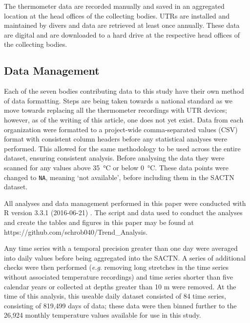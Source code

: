 \documentclass[]{ametsoc}
\begin{document}
The thermometer data are recorded manually and saved in an aggregated location at the head offices of the collecting bodies. UTRs are installed and maintained by divers and data are retrieved at least once annually. These data are digital and are downloaded to a hard drive at the respective head offices of the collecting bodies.

\subsection{Data Management}
Each of the seven bodies contributing data to this study have their own method of data formatting. Steps are being taken towards a national standard as we move towards replacing all the thermometer recordings with UTR devices; however, as of the writing of this article, one does not yet exist. Data from each organization were formatted to a project-wide comma-separated values (CSV) format with consistent column headers before any statistical analyses were performed. This allowed for the same methodology to be used across the entire dataset, ensuring consistent analysis. Before analysing the data they were scanned for any values above \SI{35}{\degreeCelsius} or below \SI{0}{\degreeCelsius}. These data points were changed to \texttt{NA}, meaning `not available', before including them in the SACTN dataset.

All analyses and data management performed in this paper were conducted with R version 3.3.1 (2016-06-21) \citep{R}. The script and data used to conduct the analyses and create the tables and figures in this paper may be found at https://github.com/schrob040/Trend\_Analysis.

Any time series with a temporal precision greater than one day were averaged into daily values before being aggregated into the SACTN. A series of additional checks were then performed (\emph{e.g}. removing long stretches in the time series without associated temperature recordings) and time series shorter than five calendar years or collected at depths greater than 10 m were removed. At the time of this analysis, this useable daily dataset consisted of 84 time series, consisting of 819,499 days of data; these data were then binned further to the 26,924 monthly temperature values available for use in this study.
\end{document}

